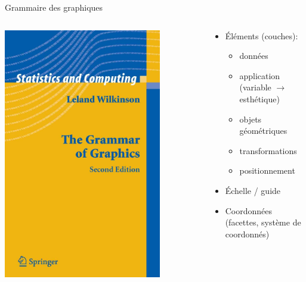 \documentclass[
  ignorenonframetext,
]{beamer}
\providecommand{\tightlist}{%
  \setlength{\itemsep}{0pt}\setlength{\parskip}{0pt}}\usepackage{longtable,booktabs,array}
\begin{document}
\begin{frame}{Grammaire des graphiques}
\protect\hypertarget{grammaire-des-graphiques}{}
\begin{columns}[T]
\begin{column}{0.4\textwidth}
\includegraphics[width=0.8\textwidth,height=\textheight]{img/03/gg-book.jpg}
\end{column}

\begin{column}{0.6\textwidth}
\begin{itemize}
\tightlist
\item
  Éléments (couches):

  \begin{itemize}
  \tightlist
  \item
    données
  \item
    application (variable \(\to\) esthétique)
  \item
    objets géométriques
  \item
    transformations
  \item
    positionnement
  \end{itemize}
\item
  Échelle / guide
\item
  Coordonnées (facettes, système de coordonnés)
\end{itemize}
\end{column}
\end{columns}
\end{frame}
\end{document}
